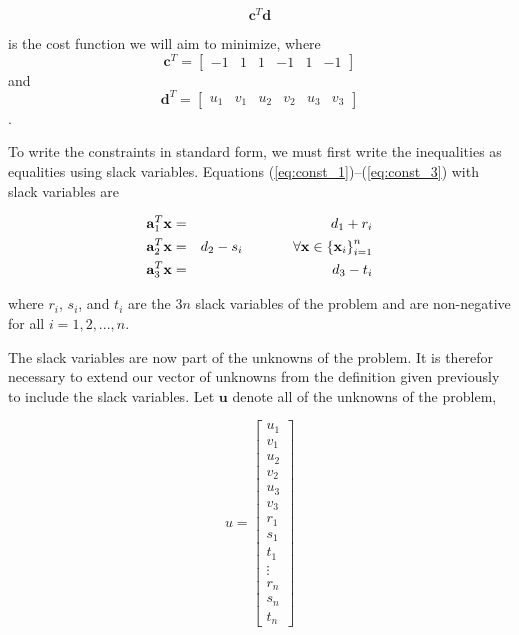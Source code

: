 \documentclass{article}
\begin{document}
\begin{equation} \label{eq:lp_cost}
\mathbf{c}^T \mathbf{d}
\end{equation}

\noindent is the cost function we will aim to minimize, where \[\mathbf{c}^T = \begin{bmatrix}-1 & 1 & 1 & -1 & 1 & -1\end{bmatrix}\] and \[\mathbf{d}^T = \begin{bmatrix}u_1 & v_1 & u_2 & v_2 & u_3 & v_3\end{bmatrix}\].

To write the constraints in standard form, we must first write the inequalities as equalities using slack variables.
Equations (\ref{eq:const_1})--(\ref{eq:const_3}) with slack variables are

\begin{eqnarray}
\label{eq:lp_const_1} \mathbf{a}_1^T \mathbf{x} &=& d_1 + r_i\\
\label{eq:lp_const_2} \mathbf{a}_2^T \mathbf{x} &=& d_2 - s_i \hspace{0.5in} \forall{\mathbf{x}} \in \left\{ \mathbf{x}_i \right\}_{i=1}^n\\
\label{eq:lp_const_3} \mathbf{a}_3^T \mathbf{x} &=& d_3 - t_i
\end{eqnarray}

\noindent where $r_i$, $s_i$, and $t_i$ are the $3n$ slack variables of the problem and are non-negative for all $i = 1, 2, ..., n$.

The slack variables are now part of the unknowns of the problem.
It is therefor necessary to extend our vector of unknowns from the definition given previously to include the slack variables.
Let $\mathbf{u}$ denote all of the unknowns of the problem,

\begin{equation} \label{eq:u}
u = \begin{bmatrix}
u_1 \\ v_1 \\ u_2 \\ v_2 \\ u_3 \\ v_3 \\
r_1 \\ s_1 \\ t_1 \\ %
\vdots \\ r_n \\ s_n \\ t_n
\end{bmatrix}
\end{equation}
\end{document}

